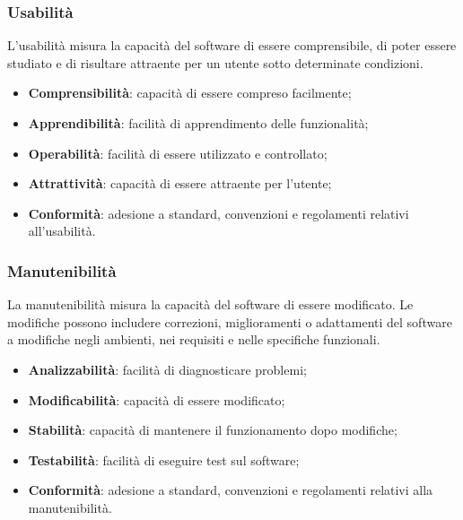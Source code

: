 \subsubsection{Usabilità}
L'usabilità misura la capacità del software di essere comprensibile, di poter essere
studiato e di risultare attraente per un utente sotto determinate condizioni.
\begin{itemize}
    \item \textbf{Comprensibilità}: capacità di essere compreso facilmente;
    \item \textbf{Apprendibilità}: facilità di apprendimento delle funzionalità;
    \item \textbf{Operabilità}: facilità di essere utilizzato e controllato;
    \item \textbf{Attrattività}: capacità di essere attraente per l'utente;
    \item \textbf{Conformità}: adesione a standard, convenzioni e regolamenti relativi all'usabilità.
\end{itemize}

\subsubsection{Manutenibilità}
La manutenibilità misura la capacità del software di essere modificato.
Le modifiche possono includere correzioni, miglioramenti o adattamenti del software
a modifiche negli ambienti, nei requisiti e nelle specifiche funzionali.
\begin{itemize}
    \item \textbf{Analizzabilità}: facilità di diagnosticare problemi;
    \item \textbf{Modificabilità}: capacità di essere modificato;
    \item \textbf{Stabilità}: capacità di mantenere il funzionamento dopo modifiche;
    \item \textbf{Testabilità}: facilità di eseguire test sul software;
    \item \textbf{Conformità}: adesione a standard, convenzioni e regolamenti relativi alla manutenibilità.
\end{itemize}

